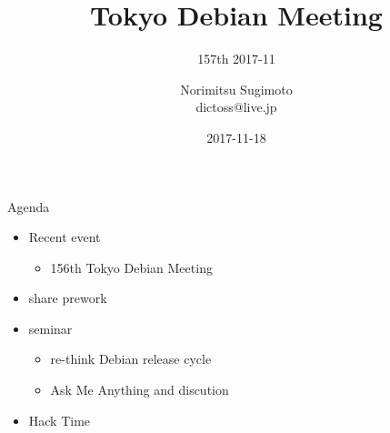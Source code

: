 \title{Tokyo Debian Meeting}
\subtitle{157th 2017-11}
\author{Norimitsu Sugimoto \\dictoss@live.jp}
\date{2017-11-18}



\begin{frame}
\titlepage{}
\end{frame}

\begin{frame}{Agenda}
 \begin{minipage}[t]{0.45\hsize}
  \begin{itemize}
  \item Recent event
    \begin{itemize}
    \item 156th Tokyo Debian Meeting
    \end{itemize}
  \item share prework
  \end{itemize}
 \end{minipage}
 \begin{minipage}[t]{0.45\hsize}
  \begin{itemize}
  \item seminar
    \begin{itemize}
    \item re-think Debian release cycle
    \item Ask Me Anything and discution
    \end{itemize}
  \item Hack Time
  \end{itemize}
 \end{minipage}
\end{frame}

